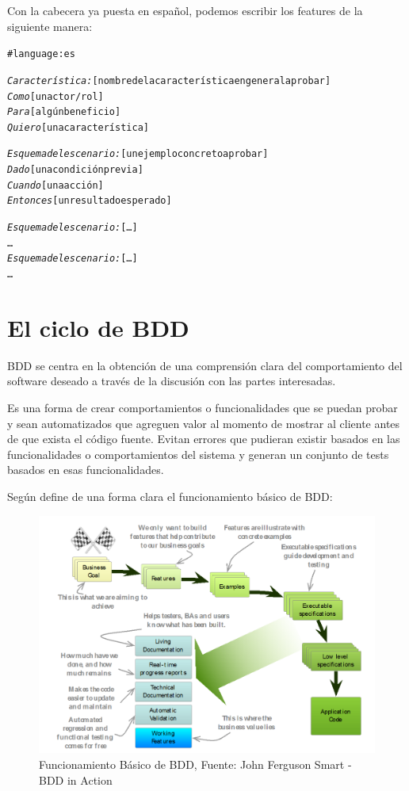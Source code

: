 Con la cabecera ya puesta en español, podemos escribir los features de la siguiente
manera:

\vspace{0.5cm}
\begin{mdframed}
\begin{alltt}
# language: es

\emph{Característica:} [nombre de la característica en general a probar]
  \emph{Como} [un actor/rol]
  \emph{Para} [algún beneficio]
  \emph{Quiero} [una característica]

  \emph{Esquema del escenario:} [un ejemplo concreto a probar]
    \emph{Dado} [una condición previa]
    \emph{Cuando} [una acción]
    \emph{Entonces} [un resultado esperado]

  \emph{Esquema del escenario:} [\ldots]
    \ldots
  \emph{Esquema del escenario:} [\ldots]
    \ldots

\end{alltt}
\end{mdframed}

\newpage
\section{El ciclo de BDD}
BDD se centra en la obtención de una comprensión clara del comportamiento del
software deseado a través de la discusión con las partes interesadas.

Es una forma de crear comportamientos o funcionalidades que se puedan probar y
sean automatizados que agreguen valor al momento de mostrar al cliente antes de
que exista el código fuente. Evitan errores que pudieran existir basados en las
funcionalidades o comportamientos del sistema y generan un conjunto de tests
basados en esas funcionalidades.

Según \citeauthor{BDDinAction} define de una forma
clara el funcionamiento básico de BDD:

\begin{figure}[h]
  \begin{center}
  \includegraphics[width=1\textwidth]{figures/chapter3/bddinaction.png}
  \caption[BDD]{Funcionamiento Básico de BDD, Fuente: John Ferguson Smart - BDD in Action}
\end{center}
\end{figure}

